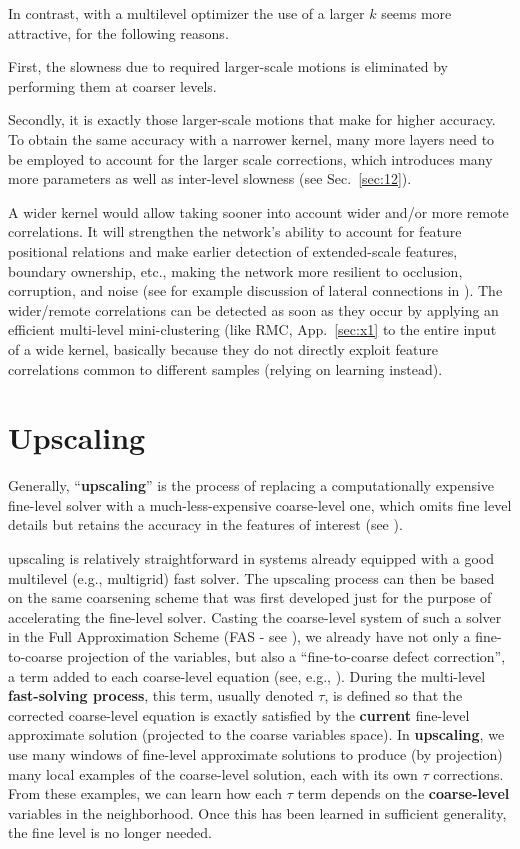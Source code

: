 \documentclass{article} %
\begin{document}
In contrast, with a multilevel optimizer the use of a larger $k$ seems more attractive, for the following reasons.

First, the slowness due to required larger-scale motions is eliminated by performing them at coarser levels.

Secondly, it is exactly those larger-scale motions that make for higher accuracy. To obtain the same accuracy with a narrower kernel, many more layers need to be employed to account for the larger scale corrections, which introduces many more parameters as well as inter-level slowness (see Sec.~\ref{sec:12}).

A wider kernel would allow taking sooner into account wider and/or more remote correlations. It will strengthen the network's ability to account for feature positional relations and make earlier detection of extended-scale features, boundary ownership, etc., making the network more resilient to occlusion, corruption, and noise (see for example discussion of lateral connections in \cite{montobbio2019kercnns, spoerer}). The wider/remote correlations can be detected as soon as they occur by applying an efficient multi-level mini-clustering (like RMC, App.~\ref{sec:x1} to the entire input of a wide kernel, basically because they do not directly exploit feature correlations common to different samples (relying on learning instead).


\section{Upscaling}
\label{sec:upscaling}
Generally, ``\textbf{upscaling}'' is the process of replacing a computationally expensive fine-level solver with a much-less-expensive coarse-level one, which omits fine level details but retains the accuracy in the features of interest (see \cite{systematic_upscaling}).

upscaling is relatively straightforward in systems already equipped with a good multilevel (e.g., multigrid) fast solver. The upscaling process can then be based on the same coarsening scheme that was first developed just for the purpose of accelerating the fine-level solver. Casting the coarse-level system of such a solver in the Full Approximation Scheme (FAS - see \cite{brandt77}), we already have not only a fine-to-coarse projection of the variables, but also a ``fine-to-coarse defect correction'', a term added to each coarse-level equation (see, e.g., \cite[Sec.~8.2]{guide}). During the multi-level \textbf{fast-solving process}, this term, usually denoted $\tau$, is defined so that the corrected coarse-level equation is exactly satisfied by the \textbf{current} fine-level approximate solution (projected to the coarse variables space). In \textbf{upscaling}, we use many windows of fine-level approximate solutions to produce (by projection) many local examples of the coarse-level solution, each with its own $\tau$ corrections. From these examples, we can learn how each $\tau$ term depends on the \textbf{coarse-level} variables in the neighborhood. Once this has been learned in sufficient generality, the fine level is no longer needed. 
\end{document}
